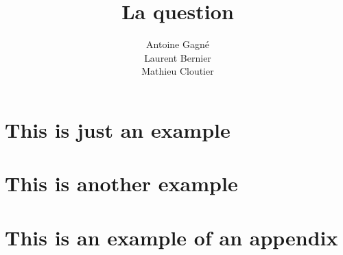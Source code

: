 \documentclass[12pt]{GDD}
\author{%
    Antoine Gagné \\%
    Laurent Bernier \\%
    Mathieu Cloutier%
}
\title{La question}
\begin{document}
\chapter{This is just an example}
\lipsum%

\chapter{This is another example}
\lipsum%

\appendix

\chapter{This is an example of an appendix}
\lipsum%
\end{document}
